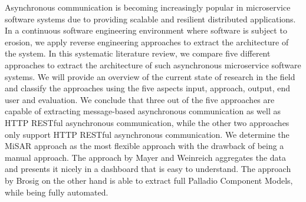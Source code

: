 
Asynchronous communication is becoming increasingly popular in microservice software systems due to providing scalable and resilient distributed applications.
In a continuous software engineering environment where software is subject to erosion, we apply reverse engineering approaches to extract the architecture of the system.
In this systematic literature review, we compare five different approaches to extract the architecture of such asynchronous microservice software systems.
We will provide an overview of the current state of research in the field and classify the approaches using the five aspects input, approach, output, end user and evaluation.
We conclude that three out of the five approaches are capable of extracting message-based asynchronous communication as well as HTTP RESTful asynchronous communication, while the other two approaches only support HTTP RESTful asynchronous communication.
We determine the MiSAR approach as the most flexible approach with the drawback of being a manual approach.
The approach by Mayer and Weinreich aggregates the data and presents it nicely in a dashboard that is easy to understand.
The approach by Brosig on the other hand is able to extract full Palladio Component Models, while being fully automated.